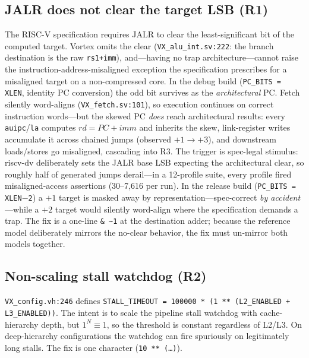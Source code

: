 \documentclass[conference]{IEEEtran}
\newcommand{\code}[1]{\texttt{\small #1}}
\begin{document}
\subsection{JALR does not clear the target LSB (R1)}
The RISC-V specification requires JALR to clear the least-significant
bit of the computed target. Vortex omits the clear
(\code{VX\_alu\_int.sv:222}: the branch destination is the raw
\code{rs1+imm}), and---having no trap architecture---cannot raise the
instruction-address-misaligned exception the specification prescribes
for a misaligned target on a non-compressed core. In the debug build
(\code{PC\_BITS = XLEN}, identity PC conversion) the odd bit survives
as the \emph{architectural} PC. Fetch silently word-aligns
(\code{VX\_fetch.sv:101}), so execution continues on correct
instruction words---but the skewed PC \emph{does} reach architectural
results: every \code{auipc}/\code{la} computes
$rd = \textit{PC} + \textit{imm}$ and inherits the skew, link-register
writes accumulate it across chained jumps (observed $+1 \to +3$), and
downstream loads/stores go misaligned, cascading into R3. The
trigger is spec-legal stimulus: riscv-dv deliberately sets the JALR
base LSB expecting the architectural clear, so roughly half of
generated jumps derail---in a 12-profile suite, every profile fired
misaligned-access assertions (30--7{,}616 per run). In the release
build (\code{PC\_BITS = XLEN$-$2}) a $+1$ target is masked away by
representation---spec-correct \emph{by accident}---while a $+2$ target
would silently word-align where the specification demands a trap. The
fix is a one-line \code{\&\,\~{}1} at the destination adder; because
the reference model deliberately mirrors the no-clear behavior, the fix
must un-mirror both models together.

\subsection{Non-scaling stall watchdog (R2)}
\code{VX\_config.vh:246} defines
\code{STALL\_TIMEOUT = 100000 * (1 ** (L2\_ENABLED + L3\_ENABLED))}.
The intent is to scale the pipeline stall watchdog with cache-hierarchy
depth, but $1^N \equiv 1$, so the threshold is constant regardless of
L2/L3. On deep-hierarchy configurations the watchdog can fire spuriously
on legitimately long stalls. The fix is one character
(\code{10\,**\,(\ldots)}).
\end{document}

